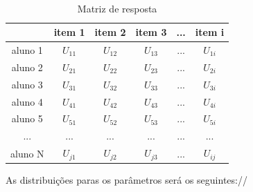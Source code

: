 	\paragraph{}
	    \begin{table}[!h]
	        \centering
	        \caption{Matriz de resposta}
	        \begin{tabular}{|c|c|c|c|c|c|}
	           \hline
	              & item 1 & item 2 & item 3 & ... & item i\\
	           \hline
	           \hline
	             aluno 1 & $U_{11}$ & $U_{12}$ & $U_{13}$ & ... & $U_{1i}$\\
	           \hline
	             aluno 2 & $U_{21}$& $U_{22}$ & $U_{23}$ & ... & $U_{2i}$\\
	           \hline
	             aluno 3 & $U_{31}$ & $U_{32}$ & $U_{33}$ & ... & $U_{3i}$\\
	           \hline
	             aluno 4 & $U_{41}$ & $U_{42}$ & $U_{43}$ & ... & $U_{4i}$\\
	           \hline
	             aluno 5 & $U_{51}$ & $U_{52}$ & $U_{53}$ & ... & $U_{5i}$\\
	           \hline
	               ...   & ... & ... & ... & ... & ...\\
	           \hline
	             aluno N & $U_{j1}$ & $U_{j2}$ & $U_{j3}$ & ... & $U_{ij}$\\
	           \hline
	        \end{tabular}
	        \label{tab:mat_resposta}
	    \end{table}
	   
	    \newpage
	     As distribuições paras os parâmetros será os seguintes://
	 

